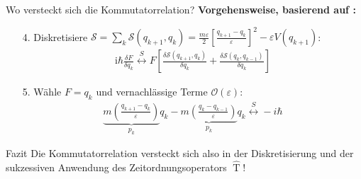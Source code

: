 \begin{frame}{Wo versteckt sich die Kommutatorrelation?}
\textbf{Vorgehensweise, basierend auf \cite{Ong}:}
\begin{enumerate}
	\item[4.] Diskretisiere $\mathcal{S}=\sum_k \mathcal{S}(q_{k+1},q_k) = \frac{m\varepsilon}{2}\left[\frac{q_{k+1}-q_k}{\varepsilon}\right]^2 - \varepsilon V(q_{k+1})$:
	\begin{align*}
		\mathrm{i}\hbar\frac{\delta F}{\delta q_k} \overset{S}{\longleftrightarrow} F\left[\frac{\delta\mathcal{S}(q_{k+1},q_k)}{\delta q_k} + \frac{\delta\mathcal{S}(q_{k},q_{k-1})}{\delta q_k}\right] 
	\end{align*}
	\item[5.] Wähle $F=q_k$ und vernachlässige Terme $\mathcal{O}(\varepsilon)$:
	\begin{align*}
		\underbrace{m\left(\frac{q_{k+1}-q_k}{\varepsilon}\right)}_{p_k}q_k - \underbrace{m\left(\frac{q_{k}-q_{k-1}}{\varepsilon}\right)}_{p_k}q_k  \overset{S}{\longleftrightarrow} -i\hbar
	\end{align*}
\end{enumerate}
\begin{block}{\hfill Fazit \hfill}
	 Die Kommutatorrelation versteckt sich also in der Diskretisierung und der sukzessiven Anwendung des Zeitordnungsoperators $\hat{\operatorname{T}}$! 
\end{block}
\end{frame}